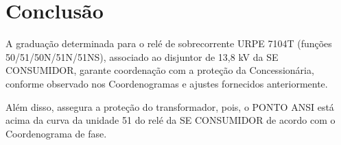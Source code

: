 \section{Conclusão}

A graduação determinada para o relé de sobrecorrente URPE 7104T (funções 50/51/50N/51N/51NS), associado ao disjuntor de 13,8 kV da SE CONSUMIDOR, garante coordenação com a proteção da Concessionária, conforme observado nos Coordenogramas e ajustes fornecidos anteriormente. 

Além disso, assegura a proteção do transformador, pois, o PONTO ANSI está acima da curva da unidade 51 do relé da SE CONSUMIDOR de acordo com o Coordenograma de fase.